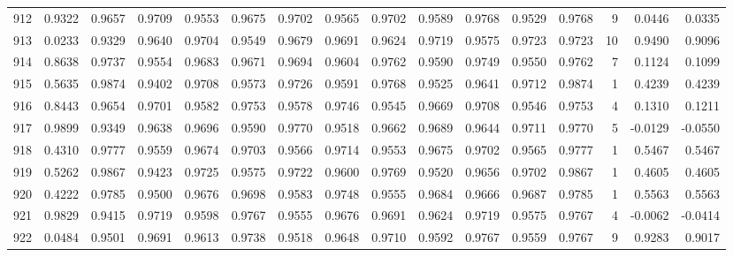 \begin{tabular}{lrrrrrrrrrrrrrrr}
912 &      0.9322 &  0.9657 &  0.9709 &  0.9553 &  0.9675 &  0.9702 &  0.9565 &  0.9702 &  0.9589 &  0.9768 &   0.9529 &     0.9768 &      9 &                    0.0446 &                     0.0335 \\
913 &      0.0233 &  0.9329 &  0.9640 &  0.9704 &  0.9549 &  0.9679 &  0.9691 &  0.9624 &  0.9719 &  0.9575 &   0.9723 &     0.9723 &     10 &                    0.9490 &                     0.9096 \\
914 &      0.8638 &  0.9737 &  0.9554 &  0.9683 &  0.9671 &  0.9694 &  0.9604 &  0.9762 &  0.9590 &  0.9749 &   0.9550 &     0.9762 &      7 &                    0.1124 &                     0.1099 \\
915 &      0.5635 &  0.9874 &  0.9402 &  0.9708 &  0.9573 &  0.9726 &  0.9591 &  0.9768 &  0.9525 &  0.9641 &   0.9712 &     0.9874 &      1 &                    0.4239 &                     0.4239 \\
916 &      0.8443 &  0.9654 &  0.9701 &  0.9582 &  0.9753 &  0.9578 &  0.9746 &  0.9545 &  0.9669 &  0.9708 &   0.9546 &     0.9753 &      4 &                    0.1310 &                     0.1211 \\
917 &      0.9899 &  0.9349 &  0.9638 &  0.9696 &  0.9590 &  0.9770 &  0.9518 &  0.9662 &  0.9689 &  0.9644 &   0.9711 &     0.9770 &      5 &                   -0.0129 &                    -0.0550 \\
918 &      0.4310 &  0.9777 &  0.9559 &  0.9674 &  0.9703 &  0.9566 &  0.9714 &  0.9553 &  0.9675 &  0.9702 &   0.9565 &     0.9777 &      1 &                    0.5467 &                     0.5467 \\
919 &      0.5262 &  0.9867 &  0.9423 &  0.9725 &  0.9575 &  0.9722 &  0.9600 &  0.9769 &  0.9520 &  0.9656 &   0.9702 &     0.9867 &      1 &                    0.4605 &                     0.4605 \\
920 &      0.4222 &  0.9785 &  0.9500 &  0.9676 &  0.9698 &  0.9583 &  0.9748 &  0.9555 &  0.9684 &  0.9666 &   0.9687 &     0.9785 &      1 &                    0.5563 &                     0.5563 \\
921 &      0.9829 &  0.9415 &  0.9719 &  0.9598 &  0.9767 &  0.9555 &  0.9676 &  0.9691 &  0.9624 &  0.9719 &   0.9575 &     0.9767 &      4 &                   -0.0062 &                    -0.0414 \\
922 &      0.0484 &  0.9501 &  0.9691 &  0.9613 &  0.9738 &  0.9518 &  0.9648 &  0.9710 &  0.9592 &  0.9767 &   0.9559 &     0.9767 &      9 &                    0.9283 &                     0.9017 \\

\end{tabular}
